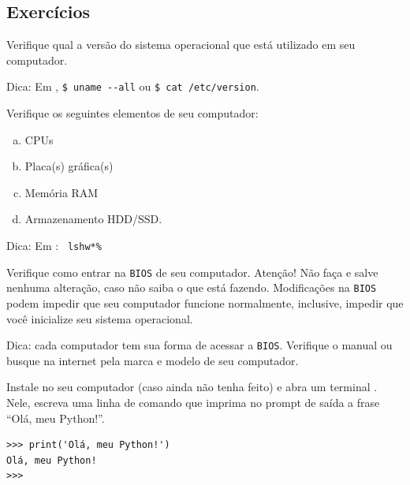 \subsection{Exercícios}

\begin{exer}
  Verifique qual a versão do sistema operacional que está utilizado em seu computador.
\end{exer}
\begin{resp}
  Dica: Em {\linux}, \lstinline+$ uname --all+ ou \lstinline+$ cat /etc/version+.
\end{resp}

\begin{exer}
  Verifique os seguintes elementos de seu computador:
  \begin{enumerate}[a)]
  \item CPUs
  \item Placa(s) gráfica(s)
  \item Memória RAM
  \item Armazenamento HDD/SSD.
  \end{enumerate}
\end{exer}
\begin{resp}
  Dica: Em {\linux}: \lstinline*$ lshw*%
\end{resp}

\begin{exer}
  Verifique como entrar na \lstinline+BIOS+ de seu computador. Atenção! Não faça  e salve nenhuma alteração, caso não saiba o que está fazendo. Modificações na \lstinline+BIOS+ podem impedir que seu computador funcione normalmente, inclusive, impedir que você inicialize seu sistema operacional.
\end{exer}
\begin{resp}
  Dica: cada computador tem sua forma de acessar a \lstinline+BIOS+. Verifique o manual ou busque na internet pela marca e modelo de seu computador.
\end{resp}

\begin{exer}
  Instale {\python} no seu computador (caso ainda não tenha feito) e abra um terminal {\python}. Nele, escreva uma linha de comando que imprima no prompt de saída a frase ``Olá, meu Python!''.
\end{exer}
\begin{resp}
\begin{lstlisting}
>>> print('Olá, meu Python!')
Olá, meu Python!
>>> 
\end{lstlisting}
\end{resp}

